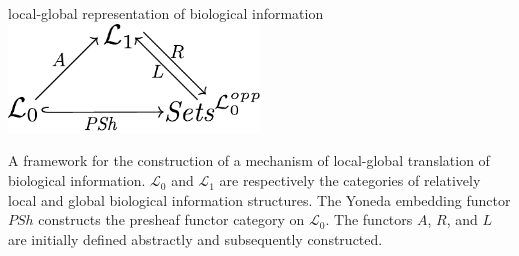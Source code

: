 \begin{frame}
\begin{block}{local-global representation of biological information}
\centering\noindent\includegraphics[width=0.5\textwidth]{fig/ascent.pdf}
\end{block}
\begin{block}{}
A framework for the construction of a mechanism of local-global translation of biological information. $\mathcal{L}_0$ and $\mathcal{L}_1$ are respectively the categories of relatively local and global biological information structures. The Yoneda embedding functor $PSh$ constructs the presheaf functor category on $\mathcal{L}_0$. The functors $A$, $R$, and $L$ are initially defined abstractly and subsequently constructed.
\end{block}
\end{frame}
